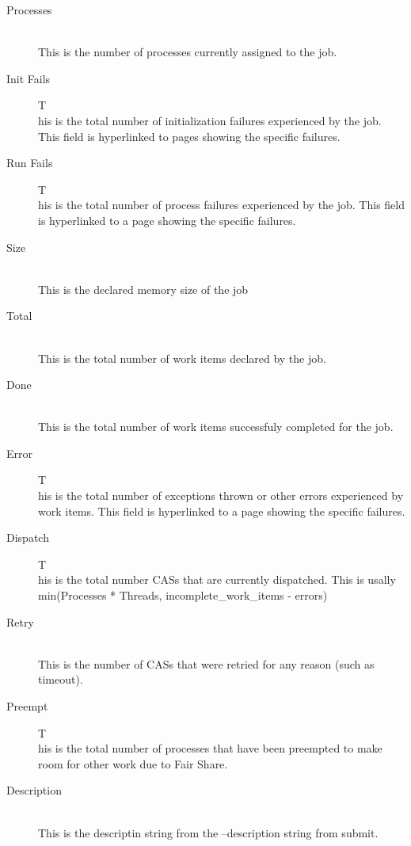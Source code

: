 \begin{description}
            \item[Processes] \hfill \\
              This is the number of processes currently assigned to the job.

            \item[Init Fails]T\hfill \\
              his is the total number of initialization failures experienced by the job. This
              field is hyperlinked to pages showing the specific failures.
              
            \item[Run Fails]T\hfill \\
              his is the total number of process failures experienced by the job. This field is
              hyperlinked to a page showing the specific failures.
              
            \item[Size] \hfill \\
              This is the declared memory size of the job
              
            \item[Total] \hfill \\
              This is the total number of work items declared by the job.
              
            \item[Done] \hfill \\
              This is the total number of work items successfuly completed for the job.
              
            \item[Error]T\hfill \\
              his is the total number of exceptions thrown or other errors experienced by work
              items. This field is hyperlinked to a page showing the specific failures.
              
            \item[Dispatch]T\hfill \\
              his is the total number CASs that are currently dispatched. This is usally
              min(Processes * Threads, incomplete\_work\_items - errors)
              
            \item[Retry] \hfill \\
              This is the number of CASs that were retried for any reason (such as timeout).
              
            \item[Preempt]T\hfill \\
              his is the total number of processes that have been preempted to make room for
              other work due to Fair Share.
              
            \item[Description] \hfill \\
              This is the descriptin string from the --description string from submit.
            \end{description}
